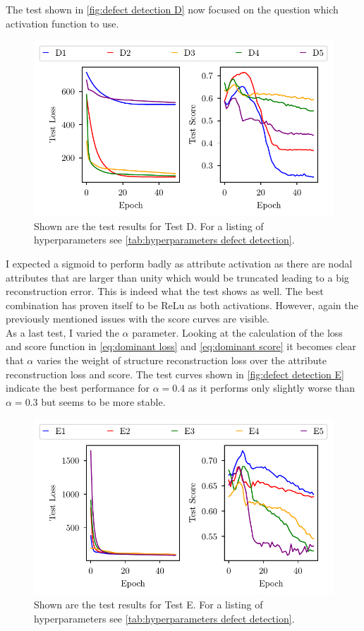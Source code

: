 \documentclass[11pt,a4paper]{article}
\begin{document}
The test shown in \autoref{fig:defect detection D} now focused on the question which activation function to use. 
\begin{figure}[htbp]
\centering
\includegraphics{images/plots/defect_detection_D.pdf}
\caption{Shown are the test results for Test D. For a listing of hyperparameters see \autoref{tab:hyperparameters defect detection}.}
\label{fig:defect detection D}
\end{figure}
I expected a sigmoid to perform badly as attribute activation as there are nodal attributes that are larger than unity which would be truncated leading to a big reconstruction error. 
This is indeed what the test shows as well. 
The best combination has proven itself to be ReLu as both activations. 
However, again the previously mentioned issues with the score curves are visible. \\


As a last test, I varied the $\alpha$ parameter. 
Looking at the calculation of the loss and score function in \autoref{eq:dominant loss} and \autoref{eq:dominant score} it becomes clear that $\alpha$ varies the weight of structure reconstruction loss over the attribute reconstruction loss and score. 
The test curves shown in \autoref{fig:defect detection E} indicate the best performance for $\alpha=0.4$ as it performs only slightly worse than $\alpha=0.3$ but seems to be more stable.  

\begin{figure}[htbp]
\centering
\includegraphics{images/plots/defect_detection_E.pdf}
\caption{Shown are the test results for Test E. For a listing of hyperparameters see \autoref{tab:hyperparameters defect detection}.}
\label{fig:defect detection E}
\end{figure}
\end{document}

